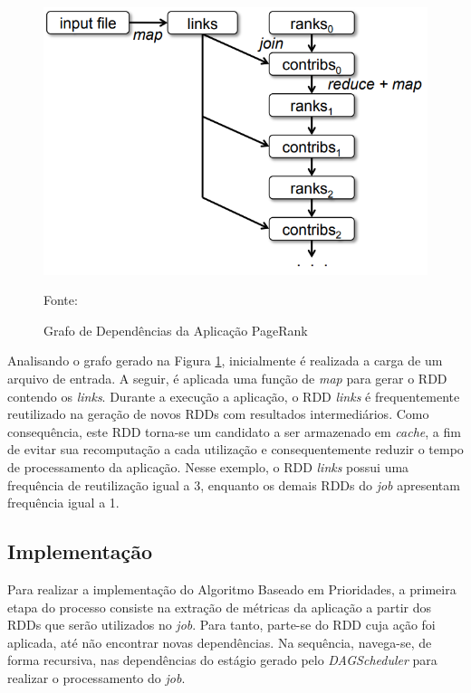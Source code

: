 \begin{figure}[!ht]
    \caption{Grafo de Dependências da Aplicação PageRank}
    \begin{center}
        \includegraphics[scale=0.33]{imagens/lineage-graph-pagerank.png}
    \end{center}
    \small{Fonte: \cite{zaharia2012rdd}}
    \label{fig:lineage-pagerank}
\end{figure}

Analisando o grafo gerado na Figura \ref{fig:lineage-pagerank}, inicialmente é realizada a carga de um arquivo de entrada. A seguir, é aplicada uma função de \textit{map} para gerar o RDD contendo os \textit{links}. Durante a execução a aplicação, o RDD \textit{links} é frequentemente reutilizado na geração de novos RDDs com resultados intermediários. Como consequência, este RDD torna-se um candidato a ser armazenado em \textit{cache}, a fim de evitar sua recomputação a cada utilização e consequentemente reduzir o tempo de processamento da aplicação. Nesse exemplo, o RDD \textit{links} possui uma frequência de reutilização igual a 3, enquanto os demais RDDs do \textit{job} apresentam frequência igual a 1.


\subsection{Implementação}
Para realizar a implementação do Algoritmo Baseado em Prioridades, a primeira etapa do processo consiste na extração de métricas da aplicação a partir dos RDDs que serão utilizados no \textit{job}. Para tanto, parte-se do RDD cuja ação foi aplicada, até não encontrar novas dependências. Na sequência, navega-se, de forma recursiva, nas dependências do estágio gerado pelo \textit{DAGScheduler} para realizar o processamento do \textit{job}. 

